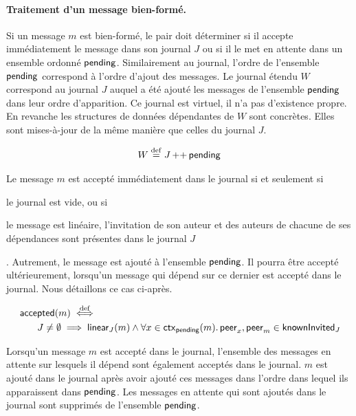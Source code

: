 \paragraph{Traitement d'un message bien-formé.} Si un message $m$ est bien-formé, le pair doit déterminer si il accepte immédiatement le message dans son journal $J$ ou si il le met en attente dans un ensemble ordonné $\operatorname{\mathsf{pending}}$.
Similairement au journal, l'ordre de l'ensemble $\operatorname{\mathsf{pending}}$ correspond à l'ordre d'ajout des messages.
Le journal étendu $W$ correspond au journal $J$ auquel a été ajouté les messages de l'ensemble $\operatorname{\mathsf{pending}}$ dans leur ordre d'apparition.
Ce journal est virtuel, il n'a pas d'existence propre.
En revanche les structures de données dépendantes de $W$ sont concrètes.
Elles sont mises-à-jour de la même manière que celles du journal $J$.

\begin{equation*}
    W \overset{\mathrm{def}}{=} J \operatorname{++} \operatorname{\mathsf{pending}}
\end{equation*}

Le message $m$ est accepté immédiatement dans le journal si et seulement si \begin{inlinelist}\item le journal est vide, ou si \item le message est linéaire, l'invitation de son auteur et des auteurs de chacune de ses dépendances sont présentes dans le journal $J$\end{inlinelist}.
Autrement, le message est ajouté à l'ensemble $\operatorname{\mathsf{pending}}$.
Il pourra être accepté ultérieurement, lorsqu'un message qui dépend sur ce dernier est accepté dans le journal.
Nous détaillons ce cas ci-après.

\begin{equation*}\begin{split}
    \MoveEqLeft\trm{accepted}(m) \defiff\\
    &J \neq \emptyset \implies \trm{linear}_J(m) \land \forall x \in \trm{ctx}_{\trm{pending}}(m) \qsep \trm{peer}_x, \trm{peer}_m \in \trm{knownInvited}_J
\end{split}\end{equation*}

Lorsqu'un message $m$ est accepté dans le journal, l'ensemble des messages en attente sur lesquels il dépend sont également acceptés dans le journal.
$m$ est ajouté dans le journal après avoir ajouté ces messages dans l'ordre dans lequel ils apparaissent dans $\operatorname{\mathsf{pending}}$.
Les messages en attente qui sont ajoutés dans le journal sont supprimés de l'ensemble $\operatorname{\mathsf{pending}}$.

